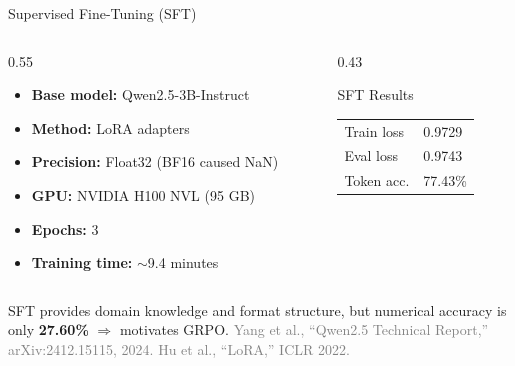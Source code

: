 \documentclass[10pt]{beamer}
\renewcommand{\footnotesize}{\tiny}
\begin{document}
\begin{frame}{Supervised Fine-Tuning (SFT)}
\large
\begin{columns}[t]
    \begin{column}{0.55\linewidth}
        \begin{itemize}
            \item \textbf{Base model:} Qwen2.5-3B-Instruct
            \item \textbf{Method:} LoRA adapters
            \item \textbf{Precision:} Float32 (BF16 caused NaN)
            \item \textbf{GPU:} NVIDIA H100 NVL (95 GB)
            \item \textbf{Epochs:} 3
            \item \textbf{Training time:} $\sim$9.4 minutes
        \end{itemize}
    \end{column}
    \begin{column}{0.43\linewidth}
        \vspace{0.2cm}
        \begin{block}{SFT Results}
            \footnotesize
            \begin{tabular}{ll}
                Train loss & 0.9729 \\
                Eval loss & 0.9743 \\
                Token acc. & 77.43\% \\
            \end{tabular}
        \end{block}
    \end{column}
\end{columns}

\vspace{0.3cm}
\centering
{\small SFT provides domain knowledge and format structure, but numerical accuracy is only \textbf{27.60\%} $\Rightarrow$ motivates GRPO.}
\vspace{\fill}
{\tiny \textcolor{gray}{Yang et al., ``Qwen2.5 Technical Report,'' arXiv:2412.15115, 2024. \quad Hu et al., ``LoRA,'' ICLR 2022.}}
\end{frame}
\end{document}
